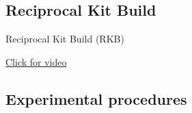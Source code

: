 \subsection{Reciprocal Kit Build}
\begin{frame}{Reciprocal Kit Build (RKB)}
    
    \href{run:/path/nameofvideo.mp4}{Click for video}
    
    
    
\end{frame}

\subsection{Experimental procedures}

